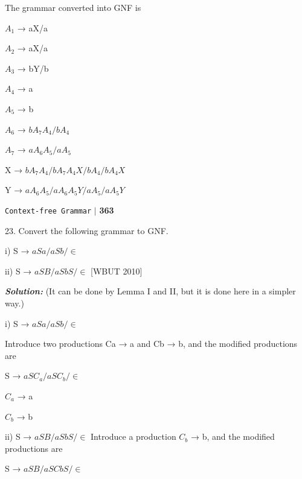 \documentclass{article}
\begin{document}
The grammar converted into GNF is 

\hspace*{5cm} $A_1$ → aX/a 

\hspace*{5cm} $A_2$ → aX/a 

\hspace*{5cm} $A_3$ → bY/b 

\hspace*{5cm} $A_4$ → a 

\hspace*{5cm} $A_5$ → b 

\hspace*{5cm} $A_6$ → $bA_7A_4/bA_4$ 

\hspace*{5cm} $A_7$ → $aA_6A_5/aA_5$ 

\hspace*{5cm} X → $bA_7A_4/bA_7A_4X/bA_4/bA_4X$ 

\hspace*{5cm} Y → $aA_6A_5/aA_6A_5Y/aA_5/aA_5Y$

\newpage
\begin{flushright}
	\texttt{Context-free Grammar} \hspace*{0.1cm}\textbf{$|$} \hspace*{0.1cm} \textbf{363}\hspace*{0.1cm}
\end{flushright}
\vspace*{0.5cm}

23. Convert the following grammar to GNF.  
 
i) S → $aSa/aSb/\in$ 

ii) S → $aSB/aSbS/\in$ \hfill [WBUT 2010] 

\textit{\textbf{Solution:}} (It can be done by Lemma I and II, but it is done here in a simpler way.)  

i) S → $aSa/aSb/\in$ 

Introduce two productions Ca → a and Cb → b, and the modiﬁed productions are 

\hspace*{5cm} S → $aSC_a/aSC_b/\in$ 

\hspace*{5cm} $C_a$ → a

\hspace*{5cm} $C_b$ → b 

ii) S → $aSB/aSbS/\in$ Introduce a production $C_b$ → b, and the modiﬁed productions are 

\hspace*{5cm} S → $aSB/aSCbS/\in$ 
\end{document}
